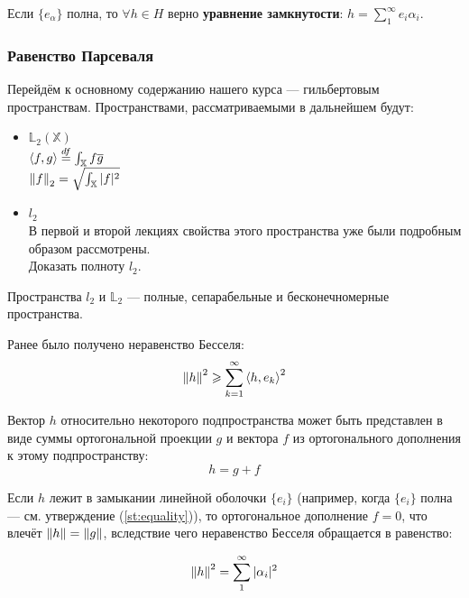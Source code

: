 \documentclass[12pt]{article}
\begin{document}
			\begin{state}
				\label{st:equality}
				Если $\{ e_\alpha \}$ полна, то $\forall h \in H$ верно \textbf{уравнение замкнутости}: $h = \sum_1^{\infty} e_i \alpha_i$.
			\end{state}

		\subsubsection{Равенство Парсеваля}


			Перейдём к основному содержанию нашего курса --- гильбертовым пространствам. Пространствами,
			рассматриваемыми в дальнейшем будут:

			\begin{itemize}
				\item $\mathbb{L}_2(\mathbb{X})$ \\
				$\left\langle f, g \right\rangle \overset{df}{=} \int_{\mathbb{X}} f\overline{g}$ \\
				$\left\| f \right\|_2 = \sqrt{\int_{\mathbb{X}} |f|^2}$ \\

				\item $l_2$ \\
				В первой и второй лекциях свойства этого пространства уже были подробным образом рассмотрены. \\
				\exc Доказать полноту $l_2$.
			\end{itemize}

			Пространства $l_2$ и $\mathbb{L}_2$ --- полные, сепарабельные и бесконечномерные пространства.

			Ранее было получено неравенство Бесселя:
			$$\left\| h \right\|^2 \geqslant \sum_{k=1}^{\infty}\left\langle h, e_k \right\rangle^2$$
			
			Вектор $h$ относительно некоторого подпространства может быть представлен в виде суммы
			ортогональной проекции $g$ и вектора $f$ из ортогонального дополнения к этому подпространству:
			$$h = g + f$$

			Если $h$ лежит в замыкании линейной оболочки $\{ e_i \}$ (например, когда $\{ e_i \}$ полна --- см. утверждение (\ref{st:equality})), то ортогональное дополнение $f = 0$, что влечёт $\left\| h \right\| = \left\| g \right\|$, вследствие чего неравенство Бесселя обращается в равенство:

			$$\left\| h \right\|^2 = \sum_1^{\infty} |\alpha_i|^2$$
\end{document}
